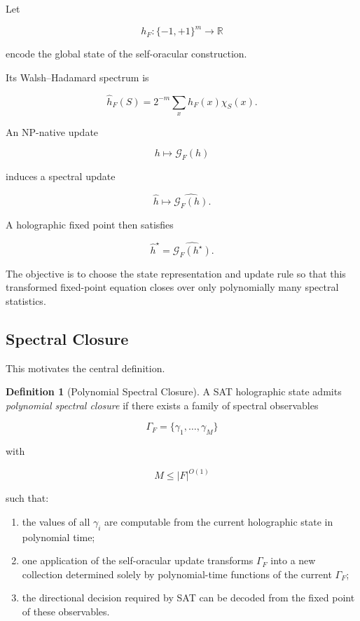 \documentclass[11pt]{article}
\theoremstyle{plain}
\theoremstyle{definition}
\newtheorem{definition}[theorem]{Definition}
\begin{document}
Let

\[
    h_F:\{-1,+1\}^{m}\to\mathbb{R}
\]

encode the global state of the self-oracular construction.

Its Walsh--Hadamard spectrum is

\[
    \widehat h_F(S)
    =
    2^{-m}
    \sum_x
    h_F(x)\chi_S(x).
\]

An NP-native update

\[
    h
    \mapsto
    \mathcal{G}_F(h)
\]

induces a spectral update

\[
    \widehat h
    \mapsto
    \widehat{\mathcal{G}_F(h)}.
\]

A holographic fixed point then satisfies

\[
\boxed{
\widehat h^\star
=
\widehat{\mathcal{G}_F(h^\star)}.
}
\]

The objective is to choose the state representation and update rule so that
this transformed fixed-point equation closes over only polynomially many
spectral statistics.

\subsection{Spectral Closure}

This motivates the central definition.

\begin{definition}[Polynomial Spectral Closure]
\label{def:polynomial-spectral-closure}
A SAT holographic state admits \emph{polynomial spectral closure} if there
exists a family of spectral observables

\[
    \Gamma_F
    =
    \{\gamma_1,\dots,\gamma_M\}
\]

with

\[
    M\leq |F|^{O(1)}
\]

such that:

\begin{enumerate}
    \item the values of all \(\gamma_i\) are computable from the current
    holographic state in polynomial time;

    \item one application of the self-oracular update transforms
    \(\Gamma_F\) into a new collection determined solely by polynomial-time
    functions of the current \(\Gamma_F\);

    \item the directional decision required by SAT can be decoded from the
    fixed point of these observables.
\end{enumerate}
\end{definition}
\end{document}
